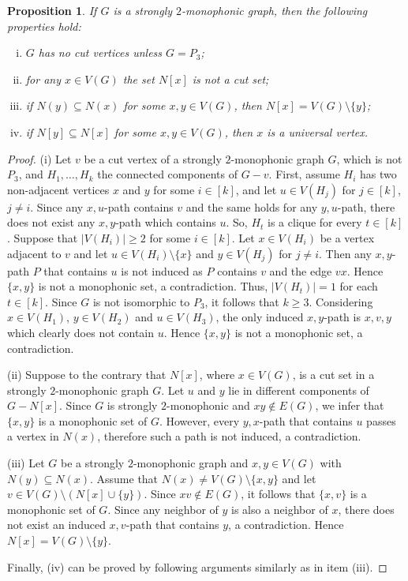 \documentclass[a4paper,11pt]{article}
\newtheorem{proposition}[theorem]{Proposition}
\begin{document}
\begin{proposition}\label{prp:necessary}
If $G$ is a strongly $2$-monophonic graph, then the following properties hold:
\begin{enumerate}[(i)]
\item $G$ has no cut vertices unless $G=P_3$;
\item for any $x\in V(G)$ the set $N[x]$ is not a cut set;
\item if $N(y)\subseteq N(x)$ for some $x,y\in V(G)$, then 
$N[x]=V(G)\setminus\{y\}$;
\item if $N[y]\subseteq N[x]$ for some $x,y\in V(G)$, then $x$ is a universal vertex.
\end{enumerate}
\end{proposition}
\begin{proof}
(i)   Let $v$ be a cut vertex of a strongly $2$-monophonic graph $G$, which is not $P_3$, and $H_1,\ldots,H_k$ the connected components of $G-v$. First, assume $H_i$ has two non-adjacent vertices $x$ and $y$ for some $i\in [k]$, and let $u \in V(H_j)$ for $j\in [k]$, $j\neq i$. Since any $x,u$-path contains $v$ and the same holds for any $y,u$-path, there does not exist any $x,y$-path which contains $u$. So, $H_t$ is a clique for every $t\in [k]$. Suppose that $|V(H_i)| \geq 2$ for some $i \in [k]$. Let $x \in V(H_i)$ be a vertex adjacent to $v$  and let $u \in V(H_i) \setminus \{x\}$ and $y \in V(H_j)$ for $j \neq i$. Then any $x,y$-path $P$ that contains $u$ is not induced as $P$ contains $v$ and the edge $vx$. Hence $\{x,y\}$ is not a monophonic set, a contradiction.
Thus, $|V(H_t)|=1$ for each $t\in [k]$.
Since $G$ is not isomorphic to $P_3$, it follows that $k\geq 3$. Considering $x\in V(H_1)$, $y\in V(H_2)$ and $u\in V(H_3)$, the only induced $x,y$-path is $x,v,y$ which clearly does not contain $u$. Hence $\{x,y\}$ is not a monophonic set, a contradiction.   

(ii) Suppose to the contrary that $N[x]$, where $x\in V(G)$, is a cut set in a strongly $2$-monophonic graph $G$. Let $u$ and $y$ lie in different components of $G-N[x]$. Since $G$ is strongly $2$-monophonic and $xy\notin E(G)$, we infer that $\{x,y\}$ is a monophonic set of $G$. However, every $y,x$-path that contains $u$ passes a vertex in $N(x)$, therefore such a path is not induced, a contradiction.  

(iii) Let $G$ be a strongly $2$-monophonic graph and $x,y\in V(G)$ with $N(y)\subseteq N(x)$. Assume that $N(x)\neq V(G)\setminus\{x,y\}$ and let $v\in V(G) \setminus (N[x]\cup\{y\})$. Since $xv\notin E(G)$, it follows that $\{x,v\}$ is a monophonic set of $G$. Since any neighbor of $y$ is also a neighbor of $x$, there does not exist an induced $x,v$-path that contains $y$, a contradiction. Hence $N[x]=V(G)\setminus \{y\}$.

Finally, (iv) can be proved by following arguments similarly as in item (iii).  
\end{proof}
\end{document}
